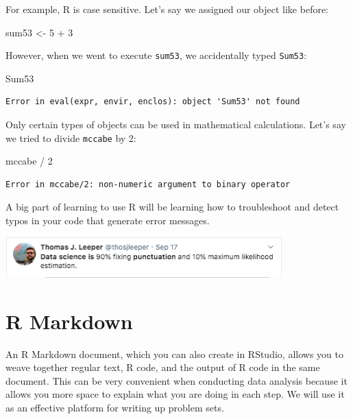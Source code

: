 \documentclass[
  letterpaper,
  DIV=11,
  numbers=noendperiod]{scrreprt}
\newenvironment{Shaded}{\begin{snugshade}}{\end{snugshade}}
\newcommand{\DecValTok}[1]{\textcolor[rgb]{0.68,0.00,0.00}{#1}}
\newcommand{\NormalTok}[1]{\textcolor[rgb]{0.00,0.23,0.31}{#1}}
\newcommand{\OtherTok}[1]{\textcolor[rgb]{0.00,0.23,0.31}{#1}}
\newcommand{\SpecialCharTok}[1]{\textcolor[rgb]{0.37,0.37,0.37}{#1}}
\begin{document}
For example, R is case sensitive. Let's say we assigned our object like
before:

\begin{Shaded}
\begin{Highlighting}[]
\NormalTok{sum53 }\OtherTok{\textless{}{-}} \DecValTok{5} \SpecialCharTok{+} \DecValTok{3}
\end{Highlighting}
\end{Shaded}

However, when we went to execute \texttt{sum53}, we accidentally typed
\texttt{Sum53}:

\begin{Shaded}
\begin{Highlighting}[]
\NormalTok{Sum53}
\end{Highlighting}
\end{Shaded}

\begin{verbatim}
Error in eval(expr, envir, enclos): object 'Sum53' not found
\end{verbatim}

Only certain types of objects can be used in mathematical calculations.
Let's say we tried to divide \texttt{mccabe} by 2:

\begin{Shaded}
\begin{Highlighting}[]
\NormalTok{mccabe }\SpecialCharTok{/} \DecValTok{2}
\end{Highlighting}
\end{Shaded}

\begin{verbatim}
Error in mccabe/2: non-numeric argument to binary operator
\end{verbatim}

A big part of learning to use R will be learning how to troubleshoot and
detect typos in your code that generate error messages.

\includegraphics[width=0.8\textwidth,height=\textheight]{images/punctuation.png}

\hypertarget{r-markdown}{%
\section{R Markdown}\label{r-markdown}}

An R Markdown document, which you can also create in RStudio, allows you
to weave together regular text, R code, and the output of R code in the
same document. This can be very convenient when conducting data analysis
because it allows you more space to explain what you are doing in each
step. We will use it as an effective platform for writing up problem
sets.
\end{document}
